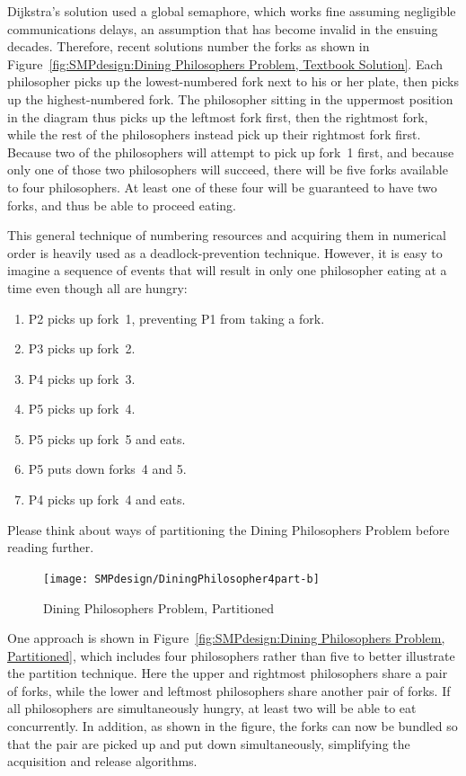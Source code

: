 Dijkstra's solution used a global semaphore, which works fine assuming
negligible communications delays, an assumption that has become invalid
in the ensuing decades.
Therefore, recent solutions number the forks as shown in
Figure~\ref{fig:SMPdesign:Dining Philosophers Problem, Textbook Solution}.
Each philosopher picks up the lowest-numbered fork next to his or her
plate, then picks up the highest-numbered fork.
The philosopher sitting in the uppermost position in the diagram thus
picks up the leftmost fork first, then the rightmost fork, while the
rest of the philosophers instead pick up their rightmost fork first.
Because two of the philosophers will attempt to pick up fork~1 first,
and because only one of those two philosophers will succeed,
there will be five forks available to four philosophers.
At least one of these four will be guaranteed to have two forks,
and thus be able to proceed eating.

This general technique of numbering resources and acquiring them in
numerical order is heavily used as a deadlock-prevention technique.
However, it is easy to imagine a sequence of events that will result
in only one philosopher eating at a time even though all are hungry:

\begin{enumerate}
    \item P2 picks up fork~1, preventing P1 from taking a fork.
    \item P3 picks up fork~2.
    \item P4 picks up fork~3.
    \item P5 picks up fork~4.
    \item P5 picks up fork~5 and eats.
    \item P5 puts down forks~4 and 5.
    \item P4 picks up fork~4 and eats.
\end{enumerate}

Please think about ways of partitioning the Dining Philosophers Problem
before reading further.
\clearpage


\begin{figure}[tb]
\begin{center}
\texttt{[image: SMPdesign/DiningPhilosopher4part-b]}
\end{center}
\caption{Dining Philosophers Problem, Partitioned}
\end{figure}

One approach is shown in
Figure~\ref{fig:SMPdesign:Dining Philosophers Problem, Partitioned},
which includes four philosophers rather than five to better illustrate the
partition technique.
Here the upper and rightmost philosophers share a pair of forks,
while the lower and leftmost philosophers share another pair of forks.
If all philosophers are simultaneously hungry, at least two will
be able to eat concurrently.
In addition, as shown in the figure, the forks can now be bundled
so that the pair are picked up and put down simultaneously, simplifying
the acquisition and release algorithms.

